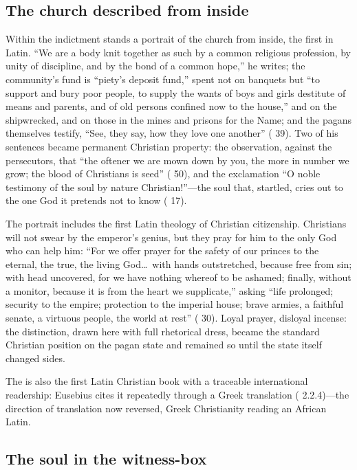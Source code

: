 \subsection{The church described from inside}

Within the indictment stands a portrait of the church from inside, the first in
Latin. ``We are a body knit together as such by a common religious profession,
by unity of discipline, and by the bond of a common hope,'' he writes; the
community's fund is ``piety's deposit fund,'' spent not on banquets but ``to
support and bury poor people, to supply the wants of boys and girls destitute
of means and parents, and of old persons confined now to the house,'' and on
the shipwrecked, and on those in the mines and prisons for the Name; and the
pagans themselves testify, ``See, they say, how they love one another''
( 39). Two of his sentences became permanent Christian property:
the observation, against the persecutors, that ``the oftener we are mown down
by you, the more in number we grow; the blood of Christians is seed''
( 50), and the exclamation ``O noble testimony of the soul by
nature Christian!''---the soul that, startled, cries out to the one God it
pretends not to know ( 17).

The portrait includes the first Latin theology of Christian citizenship.
Christians will not swear by the emperor's genius, but they pray for him to
the only God who can help him: ``For we offer prayer for the safety of our
princes to the eternal, the true, the living God\ldots\ with hands
outstretched, because free from sin; with head uncovered, for we have nothing
whereof to be ashamed; finally, without a monitor, because it is from the
heart we supplicate,'' asking ``life prolonged; security to the empire;
protection to the imperial house; brave armies, a faithful senate, a virtuous
people, the world at rest'' ( 30). Loyal prayer, disloyal
incense: the distinction, drawn here with full rhetorical dress, became the
standard Christian position on the pagan state and remained so until the
state itself changed sides.

The  is also the first Latin Christian book with a traceable
international readership: Eusebius cites it repeatedly through a Greek
translation ( 2.2.4)---the direction of translation now
reversed, Greek Christianity reading an African Latin.

\subsection{The soul in the witness-box}

